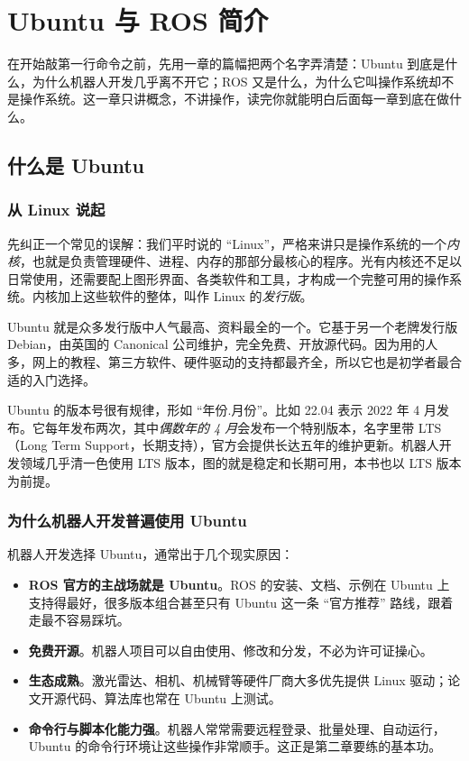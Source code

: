 \documentclass[12pt,a4paper]{ctexbook}
\begin{document}
\fi

\chapter{Ubuntu 与 ROS 简介}

在开始敲第一行命令之前，先用一章的篇幅把两个名字弄清楚：Ubuntu 到底是什么，为什么机器人开发几乎离不开它；ROS 又是什么，为什么它叫操作系统却不是操作系统。这一章只讲概念，不讲操作，读完你就能明白后面每一章到底在做什么。

\section{什么是 Ubuntu}

\subsection{从 Linux 说起}

先纠正一个常见的误解：我们平时说的 ``Linux''，严格来讲只是操作系统的一个\emph{内核}，也就是负责管理硬件、进程、内存的那部分最核心的程序。光有内核还不足以日常使用，还需要配上图形界面、各类软件和工具，才构成一个完整可用的操作系统。内核加上这些软件的整体，叫作 Linux 的\emph{发行版}。

Ubuntu 就是众多发行版中人气最高、资料最全的一个。它基于另一个老牌发行版 Debian，由英国的 Canonical 公司维护，完全免费、开放源代码。因为用的人多，网上的教程、第三方软件、硬件驱动的支持都最齐全，所以它也是初学者最合适的入门选择。

Ubuntu 的版本号很有规律，形如 ``年份.月份''。比如 22.04 表示 2022 年 4 月发布。它每年发布两次，其中\emph{偶数年的 4 月}会发布一个特别版本，名字里带 LTS（Long Term Support，长期支持），官方会提供长达五年的维护更新。机器人开发领域几乎清一色使用 LTS 版本，图的就是稳定和长期可用，本书也以 LTS 版本为前提。

\subsection{为什么机器人开发普遍使用 Ubuntu}

机器人开发选择 Ubuntu，通常出于几个现实原因：

\begin{itemize}
    \item \textbf{ROS 官方的主战场就是 Ubuntu}。ROS 的安装、文档、示例在 Ubuntu 上支持得最好，很多版本组合甚至只有 Ubuntu 这一条 ``官方推荐'' 路线，跟着走最不容易踩坑。
    \item \textbf{免费开源}。机器人项目可以自由使用、修改和分发，不必为许可证操心。
    \item \textbf{生态成熟}。激光雷达、相机、机械臂等硬件厂商大多优先提供 Linux 驱动；论文开源代码、算法库也常在 Ubuntu 上测试。
    \item \textbf{命令行与脚本化能力强}。机器人常常需要远程登录、批量处理、自动运行，Ubuntu 的命令行环境让这些操作非常顺手。这正是第二章要练的基本功。
\end{itemize}
\end{document}
